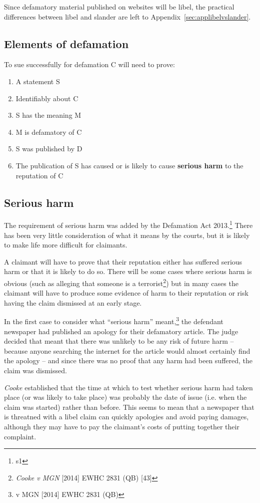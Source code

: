 \documentclass[]{article}
\begin{document}
Since defamatory material published on websites will be libel, the practical differences between libel and slander are left to Appendix~\ref{sec:applibelvslander}.

\subsection{Elements of defamation}

To sue successfully for defamation C will need to prove:

\begin{enumerate}
\item  A statement S
\item  Identifiably about C
\item  S has the meaning M
\item  M is defamatory of C
\item  S was published by D
\item The publication of S has caused or is likely to cause {\bf serious harm} to the reputation of C
\end{enumerate}

\subsection{Serious harm}
The requirement of serious harm was added by the Defamation Act 2013.\footnote{s1} There has been very little consideration of what it means by the courts, but it is likely to make life more difficult for claimants.

A claimant will have to prove that their reputation either has suffered serious harm or that it is likely to do so. There will be some cases where serious harm is obvious (such as alleging that someone is a terrorist\footnote{{\protect\it Cooke v MGN} [2014] EWHC 2831 (QB) [43]}) but in many cases the claimant will have to produce some evidence of harm to their reputation or risk having the claim dismissed at an early stage.

In the first case to consider what ``serious harm'' meant,\footnote{{\protect\itCooke v MGN} [2014] EWHC 2831 (QB)} the defendant newspaper had published an apology for their defamatory article. The judge decided that meant that there was unlikely to be any risk of future harm -- because anyone searching the internet for the article would almost certainly find the apology -- and since there was no proof that any harm had been suffered, the claim was dismissed.

{\it Cooke} established that the time at which to test whether serious harm had taken place (or was likely to take place) was probably the date of issue (i.e. when the claim was started) rather than before. This seems to mean that a newspaper that is threatned with a libel claim can quickly apologies and avoid paying damages, although they may have to pay the claimant's costs of putting together their complaint.
\end{document}
